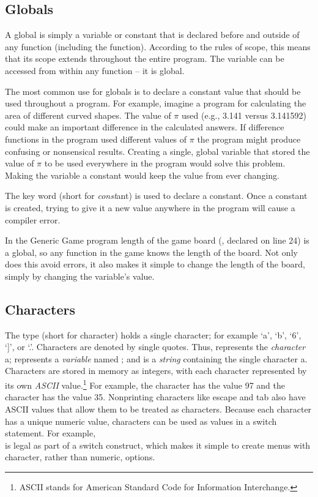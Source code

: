 \subsection{Globals}
A global is simply a variable or constant that is declared before and outside of any function (including the  function).
According to the rules of scope, this means that its scope extends throughout the entire program.  The variable can be accessed from within any function -- it is global.  

The most common use for globals is to declare a constant value that should be used throughout a program.  For example, imagine a program for calculating the area of different curved shapes.  The value of $\pi$ used (e.g., 3.141 versus 3.141592) could make an important difference in the calculated answers.  If difference functions in the program used different values of $\pi$ the program might produce confusing or nonsensical results.  Creating a single, global variable that stored the value of $\pi$ to be used everywhere in the program would solve this problem.  Making the variable a constant would keep the value from ever changing.

The key word  (short for \emph{const}ant) is used to declare a constant.  Once a constant is created, trying to give it a new value anywhere in the program will cause a compiler error. 

 In the Generic Game program length of the game board (, declared on line 24) is a global, so any function in the game knows the length of the board.  Not only does this avoid errors, it also makes it simple to change the length of the board, simply by changing the variable's value.

\subsection{Characters}

The  type (short for character) holds a single character; for example `a', `b', `6', `]', or `.'.  Characters are denoted by single quotes.  Thus,
 represents the \emph{character} a;  represents a \emph{variable} named ; and  is a \emph{string} containing the single character a.   Characters are stored in memory as integers, with each character represented by its own \emph{ASCII} value.\footnote{ASCII stands for American Standard Code for Information Interchange.}  For example, the character  has the value 97 and the character  has the value 35.  Nonprinting characters like escape and tab also have ASCII values that allow them to be treated as characters.  Because each character has a unique numeric value, characters can be used as  values in a switch statement.  For example,\\
is legal as part of a switch construct, which makes it simple to create menus with character, rather than numeric, options.

